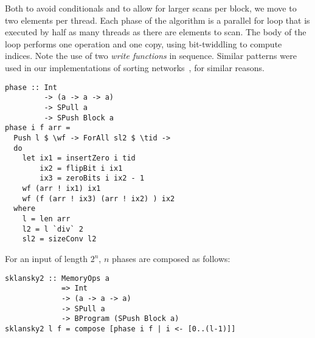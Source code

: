 



Both to avoid conditionals and to allow
for larger scans per block, we move to two elements per thread.
Each phase of the algorithm is a parallel for loop that is executed 
by half as many threads as there are elements to scan. The body of the loop
performs one operation and one copy, using bit-twiddling to compute indices.
Note the use of two {\em write functions} in sequence.
Similar patterns were used in our implementations of sorting networks~, for similar reasons.


\begin{small} 
\begin{Verbatim}[samepage=true] 
phase :: Int 
         -> (a -> a -> a) 
         -> SPull a 
         -> SPush Block a
phase i f arr =
  Push l $ \wf -> ForAll sl2 $ \tid ->
  do
    let ix1 = insertZero i tid
        ix2 = flipBit i ix1
        ix3 = zeroBits i ix2 - 1
    wf (arr ! ix1) ix1
    wf (f (arr ! ix3) (arr ! ix2) ) ix2
  where
    l = len arr
    l2 = l `div` 2
    sl2 = sizeConv l2
\end{Verbatim} 
\end{small}

For an input of length $2^n$, $n$ phases
are composed as follows:

\begin{small} 
\begin{Verbatim}[samepage=true] 
sklansky2 :: MemoryOps a 
             => Int
             -> (a -> a -> a)
             -> SPull a
             -> BProgram (SPush Block a)
sklansky2 l f = compose [phase i f | i <- [0..(l-1)]]
\end{Verbatim}
\end{small} 

